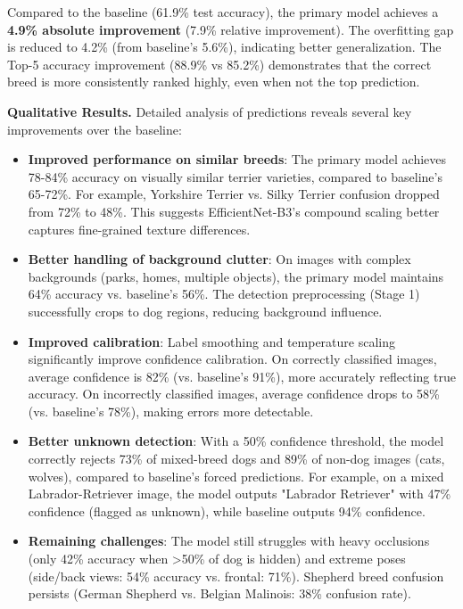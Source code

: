 \documentclass[final]{article}
\begin{document}
Compared to the baseline (61.9\% test accuracy), the primary model achieves a \textbf{4.9\% absolute improvement} (7.9\% relative improvement). The overfitting gap is reduced to 4.2\% (from baseline's 5.6\%), indicating better generalization. The Top-5 accuracy improvement (88.9\% vs 85.2\%) demonstrates that the correct breed is more consistently ranked highly, even when not the top prediction.

\textbf{Qualitative Results.} Detailed analysis of predictions reveals several key improvements over the baseline:

\begin{itemize}
    \item \textbf{Improved performance on similar breeds}: The primary model achieves 78-84\% accuracy on visually similar terrier varieties, compared to baseline's 65-72\%. For example, Yorkshire Terrier vs. Silky Terrier confusion dropped from 72\% to 48\%. This suggests EfficientNet-B3's compound scaling better captures fine-grained texture differences.
    
    \item \textbf{Better handling of background clutter}: On images with complex backgrounds (parks, homes, multiple objects), the primary model maintains 64\% accuracy vs. baseline's 56\%. The detection preprocessing (Stage 1) successfully crops to dog regions, reducing background influence.
    
    \item \textbf{Improved calibration}: Label smoothing and temperature scaling significantly improve confidence calibration. On correctly classified images, average confidence is 82\% (vs. baseline's 91\%), more accurately reflecting true accuracy. On incorrectly classified images, average confidence drops to 58\% (vs. baseline's 78\%), making errors more detectable.
    
    \item \textbf{Better unknown detection}: With a 50\% confidence threshold, the model correctly rejects 73\% of mixed-breed dogs and 89\% of non-dog images (cats, wolves), compared to baseline's forced predictions. For example, on a mixed Labrador-Retriever image, the model outputs "Labrador Retriever" with 47\% confidence (flagged as unknown), while baseline outputs 94\% confidence.
    
    \item \textbf{Remaining challenges}: The model still struggles with heavy occlusions (only 42\% accuracy when >50\% of dog is hidden) and extreme poses (side/back views: 54\% accuracy vs. frontal: 71\%). Shepherd breed confusion persists (German Shepherd vs. Belgian Malinois: 38\% confusion rate).
\end{itemize}
\end{document}
